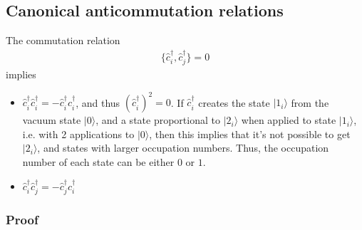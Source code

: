 \documentclass[letterpaper,10pt,english]{jupyterBook}
\begin{document}
\subsection{Canonical anti\sphinxhyphen{}commutation relations}
\label{\detokenize{ch/quantum-mechanics/many-body/fermions:canonical-anti-commutation-relations}}\label{\detokenize{ch/quantum-mechanics/many-body/fermions:quantum-mechanics-second-quantizazion-fermions-car}}
\sphinxAtStartPar
The commutation relation
\begin{equation*}
\begin{split}\{ \hat{c}_i^\dagger, \hat{c}_j^\dagger \} = 0\end{split}
\end{equation*}
\sphinxAtStartPar
implies
\begin{itemize}
\item {} 
\sphinxAtStartPar
\(\hat{c}_i^\dagger \hat{c}_i^\dagger = - \hat{c}_i^\dagger \hat{c}_i^\dagger \), and thus \(\left( \hat{c}_i^\dagger \right)^2 = 0\). If \(\hat{c}_i^\dagger\) creates the state \(| 1_i \rangle\) from the vacuum state \(| 0 \rangle\), and a state proportional to \(| 2_i \rangle\) when applied to state \(| 1_i \rangle\), i.e. with 2 applications to \(| 0 \rangle\), then this implies that it’s not possible to get \(| 2_i \rangle\), and states with larger occupation numbers. Thus, the occupation number of each state can be either \(0\) or \(1\).

\item {} 
\sphinxAtStartPar
\(\hat{c}_i^\dagger \hat{c}_j^\dagger = - \hat{c}_j^\dagger \hat{c}_i^\dagger \)

\end{itemize}
\subsubsection*{Proof}
\end{document}
